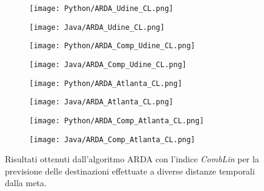 \begin{figure}[!ht]
    \begin{center}
    \begin{subfigure}[a.1]{0.45\textwidth}
        \texttt{[image: Python/ARDA\_Udine\_CL.png]} \caption{}
    \end{subfigure}
    \begin{subfigure}[a.2]{0.45\textwidth}
        \texttt{[image: Java/ARDA\_Udine\_CL.png]} \caption{}
    \end{subfigure}
    \begin{subfigure}[b.1]{0.45\textwidth}
        \texttt{[image: Python/ARDA\_Comp\_Udine\_CL.png]} \caption{}
    \end{subfigure}
    \begin{subfigure}[b.2]{0.45\textwidth}
        \texttt{[image: Java/ARDA\_Comp\_Udine\_CL.png]} \caption{}
    \end{subfigure}
    \begin{subfigure}[c.1]{0.45\textwidth}
        \texttt{[image: Python/ARDA\_Atlanta\_CL.png]} \caption{}
    \end{subfigure}
    \vspace{0.5cm}
    \begin{subfigure}[c.2]{0.45\textwidth}
        \texttt{[image: Java/ARDA\_Atlanta\_CL.png]} \caption{}
    \end{subfigure}
    \begin{subfigure}[d.1]{0.45\textwidth}
        \texttt{[image: Python/ARDA\_Comp\_Atlanta\_CL.png]} \caption{}
    \end{subfigure}
    \begin{subfigure}[d.2]{0.45\textwidth}
        \texttt{[image: Java/ARDA\_Comp\_Atlanta\_CL.png]} \caption{}
    \end{subfigure}
    \caption[ARDA_1_TT]{
    Risultati ottenuti dall'algoritmo ARDA con l'indice \textit{CombLin} per la
    previsione delle destinazioni effettuate a diverse distanze temporali dalla meta.
    }
    \label{etichetta}
    \end{center}
\end{figure}

